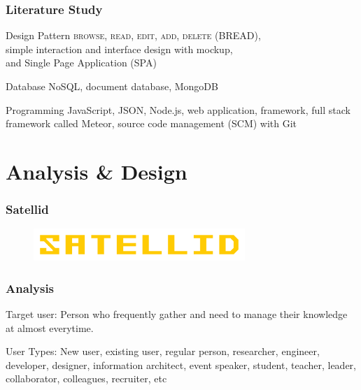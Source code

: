 \documentclass[10pt, compress]{beamer}
\begin{document}
\begin{frame}[fragile]
  \frametitle{Literature Study}

  \begin{block}{Design Pattern}
    \textsc{browse, read, edit, add, delete} (\alert{BREAD}),\\
    simple interaction and interface design with mockup,\\
    and Single Page Application (\alert{SPA})
  \end{block}

  \begin{block}{Database}
    \alert{NoSQL}, document database, \alert{MongoDB}
  \end{block}

  \begin{block}{Programming}
    \alert{JavaScript}, \alert{JSON}, \alert{Node.js}, web application, \alert{framework}, full stack framework called \alert{Meteor}, source code management (\alert{SCM}) with \alert{Git}
  \end{block}

\end{frame}


\section{Analysis \& Design}


\begin{frame}
  \frametitle{Satellid}

  \begin{figure}[ht]
    \centering
    \includegraphics[width=8cm]{include/satellid-logo.png}
    \label{fig:satellid-logo}
  \end{figure}

\end{frame}


\begin{frame}[fragile]
  \frametitle{Analysis}

    \begin{block}{Target user:}
      Person who frequently gather and need to manage their knowledge at almost everytime.
    \end{block}

    \begin{block}{User Types:}
      New user, existing user, regular person, researcher, engineer,
      developer, designer, information architect, event speaker,
      student, teacher, leader, collaborator, colleagues, recruiter, etc
    \end{block}

\end{frame}
\end{document}
